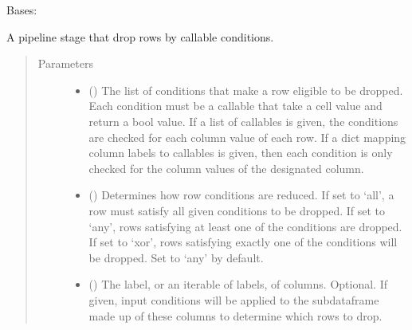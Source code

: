 \documentclass[letterpaper,10pt,english]{sphinxmanual}
\begin{document}

\begin{fulllineitems}
\label{\detokenize{dalio.pipe:dalio.pipe.RowDrop}}
Bases: 

A pipeline stage that drop rows by callable conditions.
\begin{quote}\begin{description}
\item[{Parameters}] \leavevmode\begin{itemize}
\item {} 
 () \textendash{} The list of conditions that make a row eligible to be dropped. Each
condition must be a callable that take a cell value and return a bool
value. If a list of callables is given, the conditions are checked for
each column value of each row. If a dict mapping column labels to
callables is given, then each condition is only checked for the column
values of the designated column.

\item {} 
 (\sphinxstyleliteralemphasis{\sphinxupquote{, }}\sphinxstyleliteralemphasis{\sphinxupquote{, }}) \textendash{} Determines how row conditions are reduced. If set to ‘all’, a row must
satisfy all given conditions to be dropped. If set to ‘any’, rows
satisfying at least one of the conditions are dropped. If set to ‘xor’,
rows satisfying exactly one of the conditions will be dropped. Set to
‘any’ by default.

\item {} 
 (\sphinxstyleliteralemphasis{\sphinxupquote{, }}) \textendash{} The label, or an iterable of labels, of columns. Optional. If given,
input conditions will be applied to the sub\sphinxhyphen{}dataframe made up of
these columns to determine which rows to drop.


\end{itemize}
\end{description}
\end{quote}
\end{fulllineitems}
\end{document}
